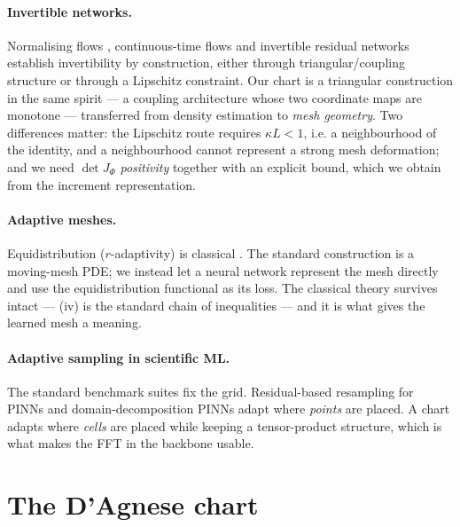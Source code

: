 \documentclass[11pt,a4paper]{article}
\theoremstyle{plain}
\theoremstyle{definition}
\newcommand{\detJ}{\det J_\Phi}
\begin{document}
\paragraph{Invertible networks.}  Normalising flows \cite{rezende2015variational,
dinh2017density}, continuous-time flows \cite{chen2018neuralode} and invertible
residual networks \cite{behrmann2019invertible}
establish invertibility by construction, either through triangular/coupling
structure or through a Lipschitz constraint.  Our chart is a triangular
construction in the same spirit — a coupling architecture whose two coordinate
maps are monotone — transferred from density estimation to \emph{mesh geometry}.
Two differences matter: the Lipschitz route requires $\kappa L<1$, i.e. a
neighbourhood of the identity, and a neighbourhood cannot represent a strong
mesh deformation; and we need $\detJ$ \emph{positivity} together with an
explicit bound, which we obtain from the increment representation.

\paragraph{Adaptive meshes.}  Equidistribution ($r$-adaptivity) is classical
\cite{deboor1973good,babuska1978error,huang2011moving,budd2009adaptivity}.
The standard construction is a moving-mesh PDE; we instead let a neural network
represent the mesh directly and use the equidistribution functional as its loss.
The classical theory survives intact — (iv) is the standard chain
of inequalities — and it is what gives the learned mesh a meaning.

\paragraph{Adaptive sampling in scientific ML.}  The standard benchmark suites
\cite{takamoto2022pdebench} fix the grid.  Residual-based resampling for
PINNs \cite{wu2023rad} and domain-decomposition PINNs \cite{jagtap2020cpinn,
kharazmi2021hpvpin} adapt where \emph{points} are placed.  A chart adapts where
\emph{cells} are placed while keeping a tensor-product structure, which is what
makes the FFT in the backbone usable.

\section{The D'Agnese chart}
\label{sec:chart}
\end{document}
